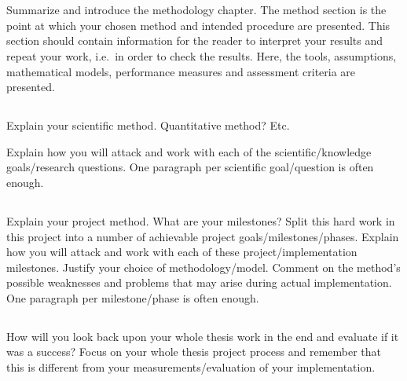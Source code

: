 \section{}\label{sec:method}
Summarize and introduce the methodology chapter. The method section is the point
at which your chosen method and intended procedure are presented. This section
should contain information for the reader to interpret your results and repeat
your work, i.e.\ in order to check the results. Here, the tools, assumptions,
mathematical models, performance measures and assessment criteria are presented.

\subsection{}\label{subsec:scientificmethod}
Explain your scientific method. Quantitative method? Etc.\ 

Explain how you will attack and work with each of the scientific/knowledge
goals/research questions. One paragraph per scientific goal/question is often
enough.

\subsection{}\label{subsec:projectmethod}
Explain your project method. What are your milestones?
Split this hard work in this project into a number of achievable project
goals/milestones/phases. Explain how you will attack and work with each of
these project/implementation milestones. Justify your choice of
methodology/model. Comment on the method's possible weaknesses and problems that
may arise during actual implementation. One paragraph per milestone/phase is
often enough.

\subsection{}\label{subsec:evalmethod}
How will you look back upon your whole thesis work in the end and evaluate if it
was a success? Focus on your whole thesis project process and remember that this
is different from your measurements/evaluation of your implementation.
